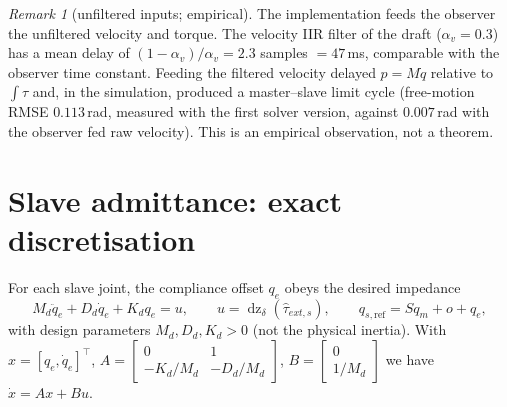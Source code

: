 \documentclass[11pt,a4paper]{article}
\theoremstyle{remark}
\newtheorem{remark}[theorem]{Remark}
\theoremstyle{definition}
\newcommand{\dz}{\operatorname{dz}}
\begin{document}
\begin{remark}[unfiltered inputs; empirical]
The implementation feeds the observer the unfiltered velocity and torque. The velocity IIR filter of the draft ($\alpha_v=0.3$) has a mean delay of
$(1-\alpha_v)/\alpha_v=2.3$ samples $=47$\,ms, comparable with the observer time constant. Feeding the filtered velocity delayed $p=M\dot q$
relative to $\int\tau$ and, in the simulation, produced a master--slave limit cycle (free-motion RMSE $0.113$\,rad, measured with the first solver version, against $0.007$\,rad with the observer fed raw velocity).
This is an empirical observation, not a theorem.
\end{remark}

\section{Slave admittance: exact discretisation}\label{sec:adm}
For each slave joint, the compliance offset $q_e$ obeys the desired impedance
\begin{equation}\label{eq:adm}
M_d\ddot q_e+D_d\dot q_e+K_dq_e=u,\qquad u=\dz_\delta(\hat\tau_{ext,s}),\qquad q_{s,\mathrm{ref}}=Sq_m+o+q_e,
\end{equation}
with design parameters $M_d,D_d,K_d>0$ (not the physical inertia). With $x=[q_e,\dot q_e]^\top$,
$A=\begin{bmatrix}0&1\\-K_d/M_d&-D_d/M_d\end{bmatrix}$, $B=\begin{bmatrix}0\\1/M_d\end{bmatrix}$ we have $\dot x=Ax+Bu$.
\end{document}
